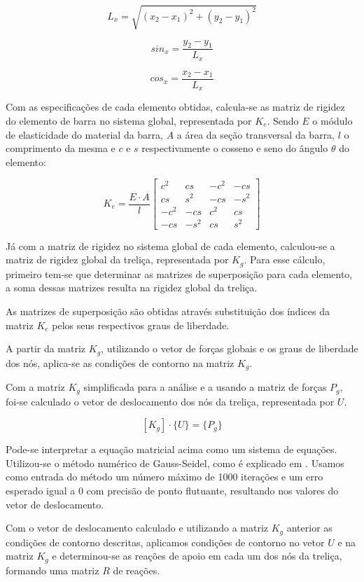 \documentclass[paper=a4, fontsize=11pt]{scrartcl}
\begin{document}
\[L_x = \sqrt{(x_2 - x_1)^2 + (y_2 - y_1)^2}\]

\[sin_x = \frac{y_2 - y_1}{L_x}\]

\[cos_x = \frac{x_2 - x_1}{L_x} \]

Com as especificações de cada elemento obtidas, calcula-se as matriz de rigidez do elemento de barra no sistema global, representada por \(K_e\). Sendo \(E\) o módulo de elasticidade do material da barra, \(A\) a área da seção transversal da barra, \(l\) o comprimento da mesma e \(c\) e \(s\) respectivamente o cosseno e seno do ângulo \(\theta\) do elemento:

\[K_e = \frac{E \cdot A}{l}
\begin{bmatrix}
c^2 & cs & -c^2 & -cs\\
cs & s^2 & -cs & -s^2 \\
-c^2 & -cs & c^2 & cs \\
-cs & -s^2 & cs & s^2
\end{bmatrix}
\]

Já com a matriz de rigidez no sistema global de cada elemento, calculou-se a matriz de rigidez global da treliça, representada por \(K_g\). Para esse cálculo, primeiro tem-se que determinar as matrizes de superposição para cada elemento, a soma dessas matrizes resulta na rigidez global da treliça. 
	
As matrizes de superposição são obtidas através substituição dos índices da matriz \(K_e\) pelos seus respectivos graus de liberdade.

A partir da matriz \(K_g\), utilizando o vetor de forças globais e os graus de liberdade dos nós, aplica-se as condições de contorno na matriz \(K_g\).

Com a matriz \(K_g\) simplificada para a análise e a usando a matriz de forças \(P_g\), foi-se calculado o vetor de deslocamento dos nós da treliça, representada por \(U\).

\[[K_g]\cdot\{U\} = \{P_g\}\]

Pode-se interpretar a equação matricial acima como um sistema de equações. Utilizou-se o método numérico de Gauss-Seidel, como é explicado em \cite{gauss_seidel}. Usamos como entrada do método um número máximo de 1000 iterações e um erro esperado igual a 0 com precisão de ponto flutuante, resultando nos valores do vetor de deslocamento.

Com o vetor de deslocamento calculado e utilizando a matriz \(K_g\) anterior as condições de contorno descritas, aplicamos condições de contorno no vetor \(U\) e na matriz \(K_g\) e determinou-se as reações de apoio em cada um dos nós da treliça, formando uma matriz \(R\) de reações.
\end{document}

